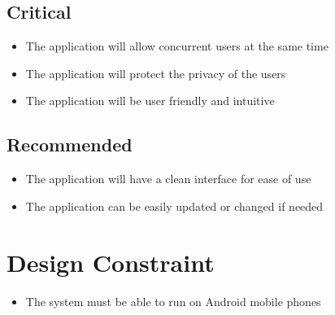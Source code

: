\subsection{Critical}
	\begin{itemize}
		\item The application will allow concurrent users at the same time
		\item The application will protect the privacy of the users
		\item The application will be user friendly and intuitive
	\end{itemize}
\subsection{Recommended}
	\begin{itemize}
		\item The application will have a clean interface for ease of use
		\item The application can be easily updated or changed if needed
	\end{itemize}

\section{Design Constraint}
	\begin{itemize}
		\item The system must be able to run on Android mobile phones
	\end{itemize}
